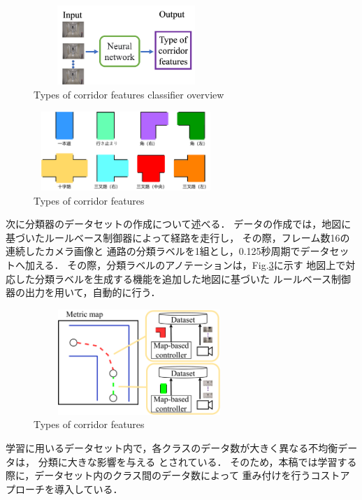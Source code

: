 \documentclass{sice-si}
\begin{document}
\begin{figure}[h!]
    \centering
     \includegraphics[height=30mm,width=70mm]{./figs/LRCN_gai.png}
     \caption{Types of corridor features classifier overview}\label{fig:lrcn}
\end{figure}
\begin{figure}[h!]
    \centering
     \includegraphics[height=30mm,width=70mm]{./figs/corridor.pdf}
     \caption{Types of corridor features}\label{fig:intersection}
\end{figure}
\par
次に分類器のデータセットの作成について述べる．
データの作成では，地図に基づいたルールベース制御器によって経路を走行し，
その際，フレーム数16の連続したカメラ画像と
通路の分類ラベルを1組とし，0.125秒周期でデータセットへ加える．
その際，分類ラベルのアノテーションは，Fig.\ref{fig:map2label}に示す
地図上で対応した分類ラベルを生成する機能を追加した地図に基づいた
ルールベース制御器の出力を用いて，自動的に行う．
\begin{figure}[h!]
    \centering
     \includegraphics[height=40mm,width=80mm]{./figs/map_label.pdf}
     \caption{Types of corridor features}\label{fig:map2label}
\end{figure}
\par
学習に用いるデータセット内で，各クラスのデータ数が大きく異なる不均衡データは，
分類に大きな影響を与える
\cite{hukin}
とされている．
そのため，本稿では学習する際に，データセット内のクラス間のデータ数によって
重み付けを行うコストアプローチ\cite{cost}を導入している．
\end{document}
